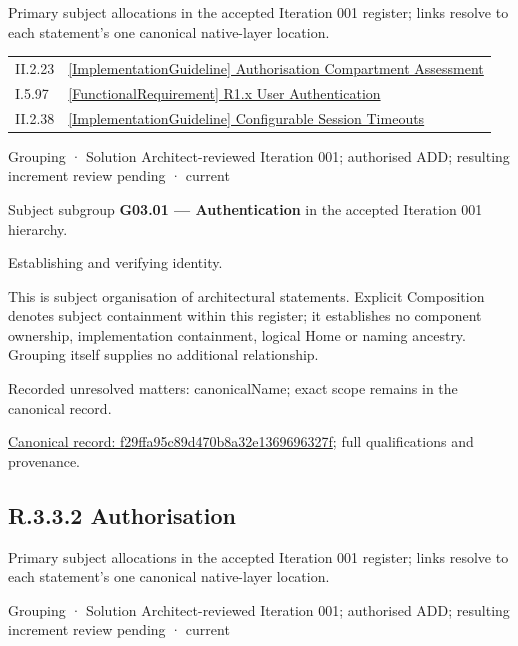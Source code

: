 Primary subject allocations in the accepted Iteration 001 register; links resolve to each statement’s one canonical native-layer location.\par
\begin{longtable}{p{.22\linewidth}p{.73\linewidth}}
II.2.23 & \hyperref[element:a471a150c7d24210a991e96ed82e27a2]{[ImplementationGuideline] Authorisation Compartment Assessment} \\
I.5.97 & \hyperref[element:9683182663cd40428d806ed2d8685511]{[FunctionalRequirement] R1.x User Authentication} \\
II.2.38 & \hyperref[element:886896239b2e40b0b3bda53e922a2ab6]{[ImplementationGuideline] Configurable Session Timeouts} \\
\end{longtable}
\label{element:f29ffa95c89d470b8a32e1369696327f}
{\small Grouping · Solution Architect-reviewed Iteration 001; authorised ADD; resulting increment review pending · current}\par

Subject subgroup \textbf{G03.01 — Authentication} in the accepted Iteration 001 hierarchy.



Establishing and verifying identity.



This is subject organisation of architectural statements. Explicit Composition denotes subject containment within this register; it establishes no component ownership, implementation containment, logical Home or naming ancestry. Grouping itself supplies no additional relationship.


{\small Recorded unresolved matters: canonicalName; exact scope remains in the canonical record.}\par
{\footnotesize \href{../../../../continuum/grouping/f29ffa95c89d470b8a32e1369696327f.md}{Canonical record: f29ffa95c89d470b8a32e1369696327f}; full qualifications and provenance.}\par
\subsection*{R.3.3.2 Authorisation}
\label{navigation:R.3.3.2}

Primary subject allocations in the accepted Iteration 001 register; links resolve to each statement’s one canonical native-layer location.\par
\label{element:4648cf5a1f8e4333978c13efae10eaa5}
{\small Grouping · Solution Architect-reviewed Iteration 001; authorised ADD; resulting increment review pending · current}\par

